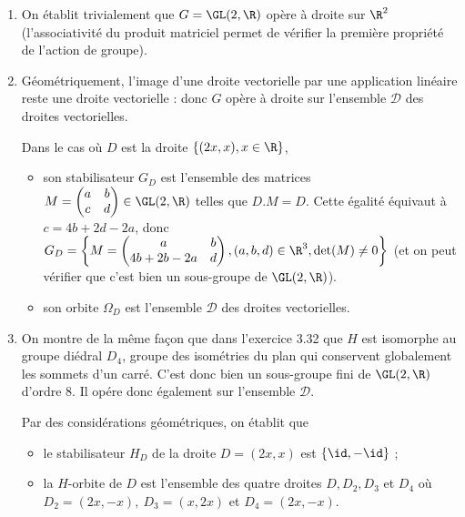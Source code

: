 
\begin{enumerate}
  \item 
    On établit trivialement que $G = \GL(2,\R)$ opère à droite sur $\R^2$ (l'associativité du produit matriciel permet de vérifier la première propriété de l'action de groupe).

  \item Géométriquement, l'image d'une droite vectorielle par une application linéaire reste une droite vectorielle : donc $G$ opère à droite sur l'ensemble $\mathcal{D}$ des droites vectorielles.

    Dans le cas où $D$ est la droite $\{(2x,x), x\in \R \}$,
    \begin{itemize}
      \item son stabilisateur $G_D$ est l'ensemble des matrices $M = \begin{pmatrix}a &b \\ c & d \end{pmatrix}\in \GL(2,\R)$ telles que $D. M = D$. Cette égalité équivaut à $c = 4b+2d-2a$, donc
      $G_D = \left\{M = \begin{pmatrix}a &b \\ 4b+2b-2a & d \end{pmatrix}, (a,b,d) \in \R^3, \det(M)\neq 0 \right\}$ (et on peut vérifier que c'est bien un sous-groupe de $\GL(2,\R)$).
      \item son orbite $\Omega_D$ est l'ensemble $\mathcal{D}$ des droites vectorielles.
    \end{itemize}

  \item On montre de la même façon que dans l'exercice 3.32 que $H$ est isomorphe au groupe diédral $D_4$, groupe des isométries du plan qui conservent globalement les sommets d'un carré. C'est donc bien 
  un sous-groupe fini de $\GL(2,\R)$ d'ordre 8. Il opére donc également sur l'ensemble  $\mathcal{D}$.

  Par des considérations géométriques, on établit que 
  \begin{itemize}
    \item le stabilisateur $H_D$ de la droite $D = (2x,x)$ est $\{ \id, -\id\}$ ; 
    \item la $H$-orbite de $D$  est l'ensemble des quatre droites $D, D_2, D_3$ et $D_4$ où $D_2 = (2x,-x),~ D_3 = (x, 2x)$ et $D_4 = (2x, -x)$.
  \end{itemize}
\end{enumerate}
